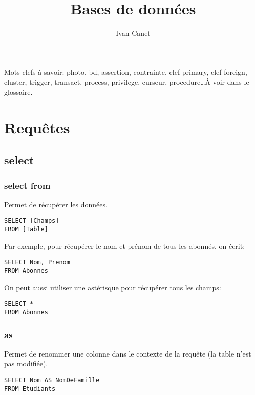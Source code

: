 \documentclass[10pt,a4paper,french]{article}
\begin{document}
\title{Bases de données}
\author{Ivan Canet}
\maketitle


\tableofcontents

Mots-clefs à savoir: \gls{photo}, \gls{bd}, \gls{assertion}, \gls{contrainte}, \gls{clef-primary}, \gls{clef-foreign}, \gls{cluster}, \gls{trigger}, \gls{transact}, \gls{process}, \gls{privilege}, \gls{curseur}, \gls{procedure}\ldots À voir dans le glossaire.

\section{Requêtes}

\subsection{\gls{select}}

\subsubsection{\gls{select} \gls{from}}

Permet de récupérer les données.
\begin{verbatim}
SELECT [Champs]
FROM [Table]
\end{verbatim}

Par exemple, pour récupérer le nom et prénom de tous les abonnés, on écrit:
\begin{verbatim}
SELECT Nom, Prenom
FROM Abonnes
\end{verbatim}

On peut aussi utiliser une astérisque pour récupérer tous les champs:
\begin{verbatim}
SELECT *
FROM Abonnes
\end{verbatim}

\subsubsection{\gls{as}}

Permet de renommer une colonne dans le contexte de la requête (la table n'est pas modifiée).
\begin{verbatim}
SELECT Nom AS NomDeFamille
FROM Etudiants
\end{verbatim}
\end{document}
